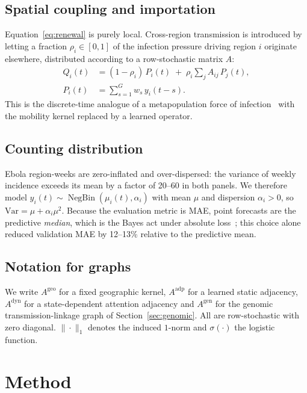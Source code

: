 \documentclass[conference]{IEEEtran}
\DeclareMathOperator{\NB}{NegBin}
\begin{document}
\subsection{Spatial coupling and importation}

Equation~\eqref{eq:renewal} is purely local. Cross-region transmission is introduced by letting a fraction $\rho_i\in[0,1]$ of the infection pressure driving region $i$ originate elsewhere, distributed according to a row-stochastic matrix $A$:
\begin{equation}
\begin{aligned}
Q_i(t) &= (1-\rho_i)\,P_i(t) \;+\; \rho_i \sum_{j} A_{ij}\,P_j(t),\\[2pt]
P_i(t) &= \sum_{s=1}^{G} w_s\, y_i(t-s).
\end{aligned}
\label{eq:import}
\end{equation}
This is the discrete-time analogue of a metapopulation force of infection~\cite{riley2007} with the mobility kernel replaced by a learned operator.

\subsection{Counting distribution}

Ebola region-weeks are zero-inflated and over-dispersed: the variance of weekly incidence exceeds its mean by a factor of 20--60 in both panels. We therefore model $y_i(t)\sim\NB(\mu_i(t),\alpha_i)$ with mean $\mu$ and dispersion $\alpha_i>0$, so $\mathrm{Var}=\mu+\alpha_i\mu^2$. Because the evaluation metric is MAE, point forecasts are the predictive \emph{median}, which is the Bayes act under absolute loss~\cite{gneiting2011}; this choice alone reduced validation MAE by 12--13\% relative to the predictive mean.

\subsection{Notation for graphs}

We write $A^{\mathrm{geo}}$ for a fixed geographic kernel, $A^{\mathrm{adp}}$ for a learned static adjacency, $A^{\mathrm{dyn}}$ for a state-dependent attention adjacency and $A^{\mathrm{gen}}$ for the genomic transmission-linkage graph of Section~\ref{sec:genomic}. All are row-stochastic with zero diagonal. $\|\cdot\|_1$ denotes the induced $1$-norm and $\sigma(\cdot)$ the logistic function.


\section{Method}\label{sec:method}
\end{document}
